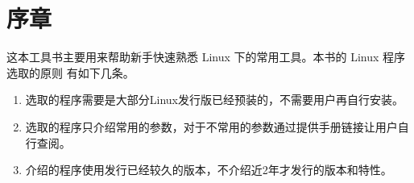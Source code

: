 \chapter{序章}

这本工具书主要用来帮助新手快速熟悉 Linux 下的常用工具。本书的 Linux 程序选取的原则
有如下几条。

\begin{enumerate}
\item 选取的程序需要是大部分Linux发行版已经预装的，不需要用户再自行安装。
\item 选取的程序只介绍常用的参数，对于不常用的参数通过提供手册链接让用户自行查阅。
\item 介绍的程序使用发行已经较久的版本，不介绍近2年才发行的版本和特性。
\end{enumerate}



